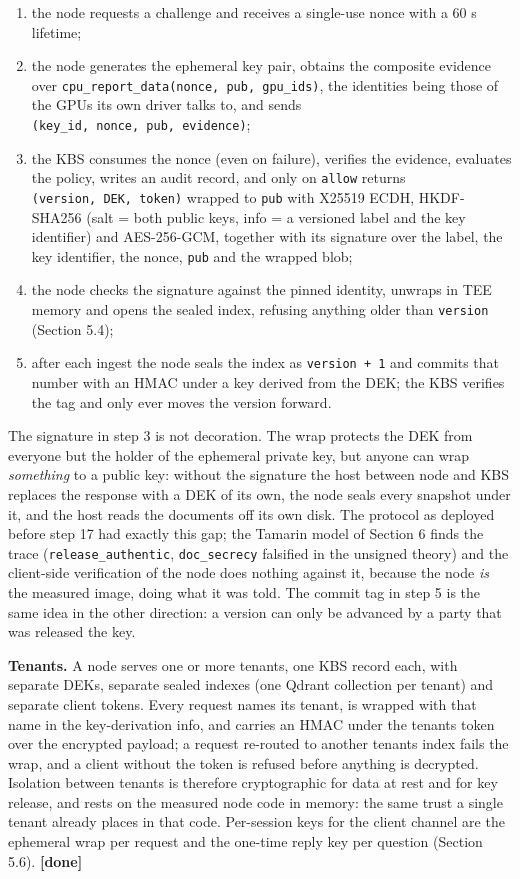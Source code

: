 \documentclass[letterpaper,twocolumn,10pt]{article}
\providecommand{\tightlist}{\setlength{\itemsep}{0pt}\setlength{\parskip}{0pt}}
\begin{document}
\begin{enumerate}
\def\labelenumi{\arabic{enumi}.}
\tightlist
\item
  the node requests a challenge and receives a single-use nonce with a 60 s lifetime;
\item
  the node generates the ephemeral key pair, obtains the composite evidence over \texttt{cpu\_report\_data(nonce,\ pub,\ gpu\_ids)}, the identities being those of the GPUs its own driver talks to, and sends \texttt{(key\_id,\ nonce,\ pub,\ evidence)};
\item
  the KBS consumes the nonce (even on failure), verifies the evidence, evaluates the policy, writes an audit record, and only on \texttt{allow} returns \texttt{(version,\ DEK,\ token)} wrapped to \texttt{pub} with X25519 ECDH, HKDF-SHA256 (salt = both public keys, info = a versioned label and the key identifier) and AES-256-GCM, together with its signature over the label, the key identifier, the nonce, \texttt{pub} and the wrapped blob;
\item
  the node checks the signature against the pinned identity, unwraps in TEE memory and opens the sealed index, refusing anything older than \texttt{version} (Section 5.4);
\item
  after each ingest the node seals the index as \texttt{version\ +\ 1} and commits that number with an HMAC under a key derived from the DEK; the KBS verifies the tag and only ever moves the version forward.
\end{enumerate}

The signature in step 3 is not decoration. The wrap protects the DEK from everyone but the holder of the ephemeral private key, but anyone can wrap \emph{something} to a public key: without the signature the host between node and KBS replaces the response with a DEK of its own, the node seals every snapshot under it, and the host reads the documents off its own disk. The protocol as deployed before step 17 had exactly this gap; the Tamarin model of Section 6 finds the trace (\texttt{release\_authentic}, \texttt{doc\_secrecy} falsified in the unsigned theory) and the client-side verification of the node does nothing against it, because the node \emph{is} the measured image, doing what it was told. The commit tag in step 5 is the same idea in the other direction: a version can only be advanced by a party that was released the key.

\textbf{Tenants.} A node serves one or more tenants, one KBS record each, with separate DEKs, separate sealed indexes (one Qdrant collection per tenant) and separate client tokens. Every request names its tenant, is wrapped with that name in the key-derivation info, and carries an HMAC under the tenant\textquotesingle s token over the encrypted payload; a request re-routed to another tenant\textquotesingle s index fails the wrap, and a client without the token is refused before anything is decrypted. Isolation between tenants is therefore cryptographic for data at rest and for key release, and rests on the measured node code in memory: the same trust a single tenant already places in that code. Per-session keys for the client channel are the ephemeral wrap per request and the one-time reply key per question (Section 5.6). \textbf{{[}done{]}}
\end{document}

